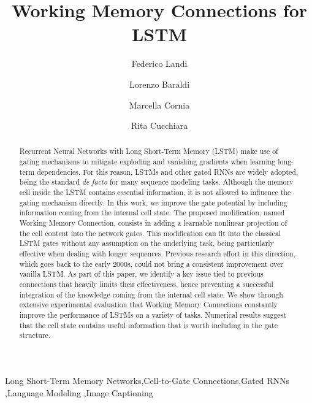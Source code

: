 \documentclass[times,authoryear]{elsarticle}
\begin{document}

%
%
%
%

\begin{frontmatter}

\title{Working Memory Connections for LSTM}

\author[1]{Federico Landi} 
\author[1]{Lorenzo Baraldi}
\author[1]{Marcella Cornia}
\author[1]{Rita Cucchiara}

\address[1]{Department of Engineering ``Enzo Ferrari'', University of Modena and Reggio Emilia, Modena, Italy}


\begin{abstract}
Recurrent Neural Networks with Long Short-Term Memory (LSTM) make use of gating mechanisms to mitigate exploding and vanishing gradients when learning long-term dependencies. For this reason, LSTMs and other gated RNNs are widely adopted, being the standard \textit{de facto} for many sequence modeling tasks. Although the memory cell inside the LSTM contains essential information, it is not allowed to influence the gating mechanism directly. In this work, we improve the gate potential by including information coming from the internal cell state. The proposed modification, named Working Memory Connection, consists in adding a learnable nonlinear projection of the cell content into the network gates. This modification can fit into the classical LSTM gates without any assumption on the underlying task, being particularly effective when dealing with longer sequences.
Previous research effort in this direction, which goes back to the early 2000s, could not bring a consistent improvement over vanilla LSTM.
As part of this paper, we identify a key issue tied to previous connections that heavily limits their effectiveness, hence preventing a successful integration of the knowledge coming from the internal cell state. We show through extensive experimental evaluation that Working Memory Connections constantly improve the performance of LSTMs on a variety of tasks. Numerical results suggest that the cell state contains useful information that is worth including in the gate structure.
\end{abstract}

\begin{keyword}
Long Short-Term Memory Networks\sep Cell-to-Gate Connections\sep Gated RNNs \sep Language Modeling \sep Image Captioning
\end{keyword}

\end{frontmatter}
\end{document}
